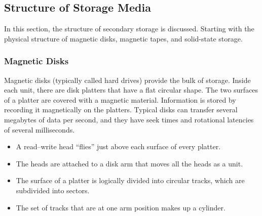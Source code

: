 \subsection{Structure of Storage Media}\label{subsec:Structure_Storage_Media}
In this section, the structure of secondary storage is discussed.
Starting with the physical structure of magnetic disks, magnetic tapes, and solid-state storage.

\subsubsection{Magnetic Disks}\label{subsubsec:Magnetic_Disks}
Magnetic disks (typically called hard drives) provide the bulk of storage.
Inside each unit, there are disk platters that have a flat circular shape.
The two surfaces of a platter are covered with a magnetic material.
Information is stored by recording it magnetically on the platters.
Typical disks can transfer several megabytes of data per second, and they have seek times and rotational latencies of several milliseconds.

\begin{itemize}[noitemsep]
\item A read–write head ``flies'' just above each surface of every platter.
\item The heads are attached to a disk arm that moves all the heads as a unit.
\item The surface of a platter is logically divided into circular tracks, which are subdivided into sectors.
\item The set of tracks that are at one arm position makes up a cylinder.
\end{itemize}


